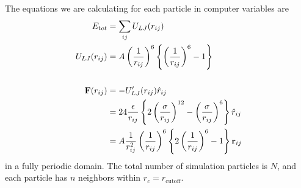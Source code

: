 \documentclass[12pt]{article}
\begin{document}
The equations we are calculating for each particle in computer variables are
\begin{align}
  E_{tot} &= \sum_{ij} U_{LJ}(r_{ij}) \\
  U_{LJ}(r_{ij}) &= 
  A\left(\frac{1}{r_{ij}}\right)^{6}\left\{ \left(\frac{1}{r_{ij}}\right)^{6} - 1 \right\} \\
  \notag\\
  \textbf{F}(r_{ij}) &= - U'_{LJ}(r_{ij})\hat{r}_{ij} \notag\\
      &=  24 \frac{\epsilon}{r_{ij}} \left\{ 2 \left(\frac{\sigma}{r_{ij}}\right)^{12}
              - \left(\frac{\sigma}{r_{ij}}\right)^6 \right\} \hat{r}_{ij} \notag\\
              &=  A \frac{1}{r_{ij}^2} \left(\frac{1}{r_{ij}}\right)^{6} \left\{ 2 \left(\frac{1}{r_{ij}}\right)^{6}
              - 1 \right\} \textbf{r}_{ij}
\end{align}
in a fully periodic domain. The total number of simulation particles
is $N$, and each particle has $n$ neighbors within
$r_c=r_{\text{cutoff}}$.
\end{document}
